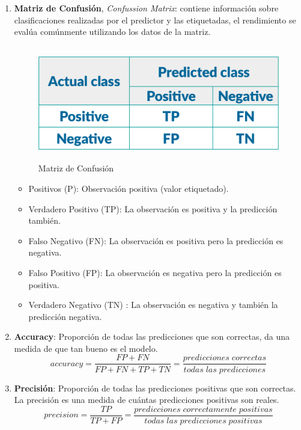 \begin{enumerate}
\item \textbf{Matriz de Confusión}, \textit{Confussion Matrix}: contiene información sobre clasificaciones realizadas por el predictor y las etiquetadas, el rendimiento  se evalúa comúnmente utilizando los datos de la matriz.

\begin{figure}[H]
 \centering
  \includegraphics[height=5cm,keepaspectratio=true,clip=true]{imagenes/MarcoTeorico/confussion_matrix.png}
  \caption{Matriz de Confusión}
	\label{Fig: confusion-matrix}
\end{figure}

\begin{itemize}
	\item Positivos (P): Observación positiva (valor etiquetado).
	\item Verdadero Positivo (TP): La observación es positiva y la predicción también.
	\item Falso Negativo (FN): La observación es positiva pero la predicción es negativa.
	\item Falso Positivo (FP): La observación es negativa pero la predicción es positiva.
	\item Verdadero Negativo (TN) :  La observación es negativa y también la predicción negativa.

\end{itemize}


\item \textbf{Accuracy}: Proporción de todas las predicciones que son correctas, da una medida de que tan bueno es el modelo.
\begin{equation}
accuracy = \frac{FP+FN}{FP+FN+TP+TN}=\frac{predicciones\;correctas}{todas\;las\;predicciones}
\end{equation}

\item \textbf{Precisión}: Proporción de todas las predicciones positivas que son correctas. La precisión es una medida de cuántas predicciones positivas son reales.
\begin{equation}
precision=\frac{TP}{TP+FP}= \frac{predicciones\;correctamente\;positivas}{todas\;las\;predicciones\;positivas}
\end{equation}


\end{enumerate}
